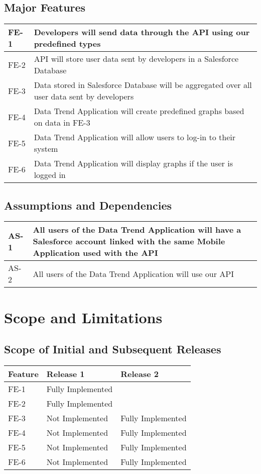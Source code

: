 \documentclass[12pt,oneside,letterpaper]{article}
\begin{document}
\subsection{Major Features}
\begin{tabular} {| p{1in} | p{4.5in} |}
\hline
FE-1 & Developers will send data through the API using our predefined types \\
\hline
FE-2 & API will store user data sent by developers in a Salesforce Database \\
\hline
FE-3 & Data stored in Salesforce Database will be aggregated over all user data sent by developers \\
\hline
FE-4 & Data Trend Application will create predefined graphs based on data in FE-3 \\
\hline
FE-5 & Data Trend Application will allow users to log-in to their system \\
\hline
FE-6 & Data Trend Application will display graphs if the user is logged in \\
\hline
\end {tabular}

\subsection{Assumptions and Dependencies}
\begin{tabular} {| p{1in} | p{4.5in} |}
\hline
AS-1 & All users of the Data Trend Application will have a Salesforce account linked with the same Mobile Application used with the API \\
\hline
AS-2 & All users of the Data Trend Application will use our API \\
\hline
\end {tabular}

\section{Scope and Limitations}
\subsection{Scope of Initial and Subsequent Releases}
\begin{tabular} {| p{1in} | p{2.2in} | p{2.2in} |}
\hline
\textbf{Feature} & \textbf{Release 1} & \textbf{Release 2} \\
\hline
FE-1 & Fully Implemented & \\ 
\hline
FE-2 & Fully Implemented & \\ 
\hline
FE-3 & Not Implemented & Fully Implemented \\ 
\hline
FE-4 & Not Implemented & Fully Implemented \\ 
\hline
FE-5 & Not Implemented & Fully Implemented \\ 
\hline
FE-6 & Not Implemented & Fully Implemented \\ 
\hline
\end {tabular}
\end{document}
